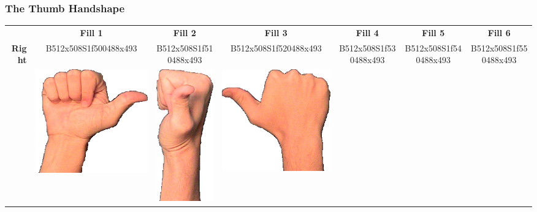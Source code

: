 \documentclass{article}
\begin{document}
\subsubsection{The Thumb Handshape}

\begin{center}
\begin{tabular}{r*{6}{c}}
&\textbf{Fill 1}&\textbf{Fill 2}&\textbf{Fill 3}&\textbf{Fill 4}&\textbf{Fill 5}&\textbf{Fill 6}\\
\multirow{2}{*}{\textbf{Right}}&
B512x508S1f500488x493&
B512x508S1f510488x493&
B512x508S1f520488x493&
B512x508S1f530488x493&
B512x508S1f540488x493&
B512x508S1f550488x493\\
&
\includegraphics[scale=0.1]{images/10-01-1.jpg}&
\includegraphics[scale=0.1]{images/10-01-2.jpg}&
\includegraphics[scale=0.1]{images/10-01-3.jpg}&

\end{tabular}
\end{center}
\end{document}
